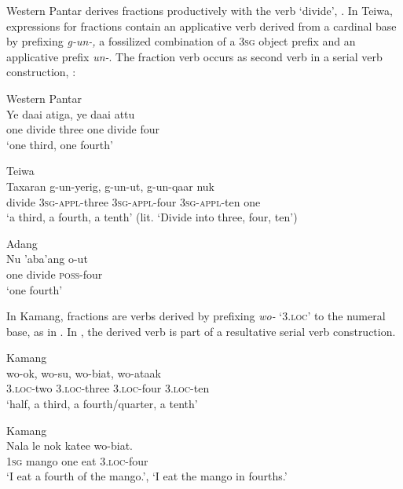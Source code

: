 Western Pantar derives fractions productively with the verb `divide', . In Teiwa, expressions for fractions contain an applicative verb derived from a cardinal base by prefixing \textit{g-un-,} a fossilized combination of a 3\textsc{sg} object prefix and an applicative prefix \textit{un-}. The fraction verb occurs as second verb in a serial verb construction, : 


\ea%
\label{bkm:Ref342746525}
{\upshape Western Pantar}\\
\gll   Ye  daai  atiga,  ye   daai  attu\\  
   one   divide  three   one  divide  four \\
\glt  `one third, one fourth'   
\z

 

\ea%
\label{bkm:Ref342746583}
{\upshape Teiwa}\\
\gll  Taxaran  g-un-yerig,  g-un-ut,  g-un-qaar nuk \\  
   divide  \textsc{3sg}-\textsc{appl}-three  \textsc{3sg}-\textsc{appl}-four  \textsc{3sg}-\textsc{appl}-ten one   \\
\glt  `a third, a fourth, a tenth' (lit. `Divide into three, four, ten')
\z


 

\ea
\label{ex:8:1248}
{\upshape Adang}\\
\gll Nu  'aba'ang  o-ut\\
  one  divide  \textsc{poss}{}-four\\
\glt `one fourth'
\z 

  

In Kamang, fractions are verbs derived by prefixing \textit{wo-} `3.\textsc{loc}' to the numeral base, as in . In , the derived verb is part of a resultative serial verb construction.


\ea%
\label{bkm:Ref342746224}
{\upshape Kamang}\\
\gll wo-ok,    wo-su,  wo-biat,  wo-ataak     \\  
   3.\textsc{loc}-two    3.\textsc{loc}-three  3.\textsc{loc}-four  3.\textsc{loc}-ten   \\
\glt `half, a third, a fourth/quarter, a tenth' 
\z

   

 

 


\ea%
\label{bkm:Ref342746258}
{\upshape Kamang}\\
\gll  Nala  le  nok  katee  wo-biat.  \\  
   \textsc{1sg} mango  one  eat  3.\textsc{loc}-four    \\
\glt `I eat a fourth of the mango.', `I eat the mango in fourths.'
\z

